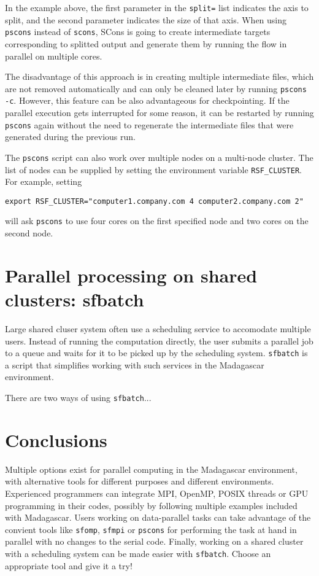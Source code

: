 In the example above, the first parameter in the \texttt{split=} list indicates the axis to
split, and the second parameter indicates the size of that axis. When
using \texttt{pscons} instead of \texttt{scons}, SCons is going to
create intermediate targets corresponding to splitted output and
generate them by running the flow in parallel on multiple cores.

The disadvantage of this approach is in creating multiple intermediate
files, which are not removed automatically and can only be cleaned
later by running \texttt{pscons -c}. However, this feature can be also
advantageous for checkpointing. If the parallel execution gets
interrupted for some reason, it can be restarted by running
\texttt{pscons} again without the need to regenerate the intermediate
files that were generated during the previous run.

The \texttt{pscons} script can also work over multiple nodes on a
multi-node cluster. The list of nodes can be supplied by setting the
environment variable \texttt{RSF\_CLUSTER}. For example, setting
\begin{verbatim}
export RSF_CLUSTER="computer1.company.com 4 computer2.company.com 2"
\end{verbatim}
will ask \texttt{pscons} to use four cores on the first specified node and two cores on the second node.

\section{Parallel processing on shared clusters: sfbatch}

Large shared cluser system often use a scheduling service to
accomodate multiple users. Instead of running the computation
directly, the user submits a parallel job to a queue and waits for it
to be picked up by the scheduling system. \texttt{sfbatch} is a script
that simplifies working with such services in the Madagascar
environment.

There are two ways of using \texttt{sfbatch}...


\section{Conclusions}

Multiple options exist for parallel computing in the Madagascar
environment, with alternative tools for different purposes and
different environments. Experienced programmers can integrate MPI,
OpenMP, POSIX threads or GPU programming in their codes, possibly by
following multiple examples included with Madagascar. Users working on
data-parallel tasks can take advantage of the convient tools like
\texttt{sfomp}, \texttt{sfmpi} or \texttt{pscons} for performing the
task at hand in parallel with no changes to the serial code. Finally,
working on a shared cluster with a scheduling system can be made
easier with \texttt{sfbatch}. Choose an appropriate tool and give it a try!





